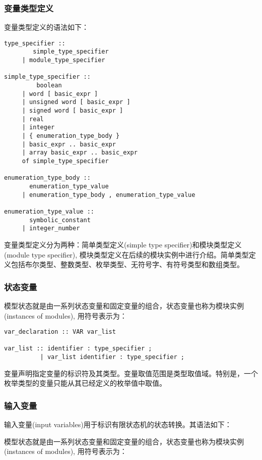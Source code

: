 \subsubsection{变量类型定义}
变量类型定义的语法如下：

\begin{lstlisting}
type_specifier ::
        simple_type_specifier
     | module_type_specifier

simple_type_specifier ::
         boolean
     | word [ basic_expr ]
     | unsigned word [ basic_expr ]
     | signed word [ basic_expr ]
     | real
     | integer
     | { enumeration_type_body }
     | basic_expr .. basic_expr
     | array basic_expr .. basic_expr
     of simple_type_specifier

enumeration_type_body ::
       enumeration_type_value
     | enumeration_type_body , enumeration_type_value

enumeration_type_value ::
       symbolic_constant
     | integer_number
\end{lstlisting}

变量类型定义分为两种：简单类型定义(simple type specifier)和模块类型定义(module type specifier), 模块类型定义在后续的模块实例中进行介绍。简单类型定义包括布尔类型、整数类型、枚举类型、无符号字、有符号类型和数组类型。

\subsubsection{状态变量}
模型状态就是由一系列状态变量和固定变量的组合，状态变量也称为模块实例(instances of modules), 用符号表示为：

\begin{lstlisting}
var_declaration :: VAR var_list

var_list :: identifier : type_specifier ;
          | var_list identifier : type_specifier ;
\end{lstlisting}

变量声明指定变量的标识符及其类型。变量取值范围是类型取值域。特别是，一个枚举类型的变量只能从其已经定义的枚举值中取值。

\subsubsection{输入变量}
输入变量(input variables)用于标识有限状态机的状态转换。其语法如下：

模型状态就是由一系列状态变量和固定变量的组合，状态变量也称为模块实例(instances of modules), 用符号表示为：

